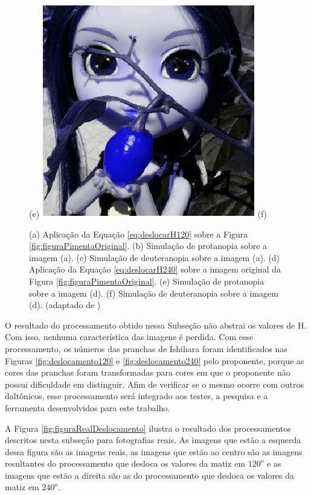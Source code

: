 \documentclass[	12pt, Times, openright, twoside, a4paper, english, brazil]{abntex2}
\begin{document}
\begin{figure}[!htb]
(e)
\endminipage\hfill
{}
\centering
{\includegraphics[width=\linewidth]{figuraPimenta240Deutran.png}}
(f)
\endminipage\hfill
\caption{
(a) Aplicação da Equação \ref{eq:deslocarH120} sobre a Figura \ref{fig:figuraPimentaOriginal}. (b) Simulação de protanopia sobre a imagem (a). (c) Simulação de deuteranopia sobre a imagem (a). (d) Aplicação da Equação \ref{eq:deslocarH240} sobre a imagem original da Figura \ref{fig:figuraPimentaOriginal}. (e) Simulação de protanopia sobre a imagem (d).
(f) Simulação de deuteranopia sobre a imagem (d). (adaptado de )}
\label{fig:figuraSimulacaoH}
\end{figure}

O resultado do processamento obtido nessa Subseção não abstrai os valores de H. Com isso, nenhuma característica das imagens é perdida. Com esse processamento, os números das pranchas de Ishihara foram identificados nas Figuras \ref{fig:deslocamento120} e \ref{fig:deslocamento240} pelo proponente, porque as cores das pranchas foram transformadas para cores em que o proponente não possui dificuldade em distinguir. Afim de verificar se o mesmo ocorre com outros daltônicos, esse processamento será integrado aos testes, a pesquisa e a ferramenta desenvolvidos para este trabalho.

A Figura \ref{fig:figuraRealDeslocamento} ilustra o resultado dos processamentos descritos nesta subseção para fotografias reais. As imagens que estão a esquerda dessa figura são as imagens reais, as imagens que estão ao centro são as imagens resultantes do processamento que desloca os valores da matiz em $120^o$ e as imagens que estão a direita são as do processamento que desloca os valores da matiz em $240^o$.
\end{document}
